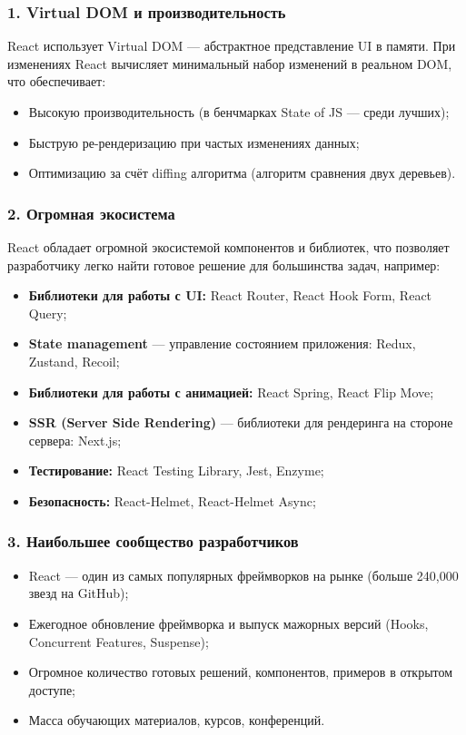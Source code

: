 \subsubsection*{1. Virtual DOM и производительность}
React использует Virtual DOM — абстрактное представление UI в памяти. При изменениях
React вычисляет минимальный набор изменений в реальном DOM, что обеспечивает:

\begin{itemize}
	\item Высокую производительность (в бенчмарках State of JS — среди лучших);
	\item Быструю ре-рендеризацию при частых изменениях данных;
	\item Оптимизацию за счёт diffing алгоритма (алгоритм сравнения двух деревьев).
\end{itemize}

\subsubsection*{2. Огромная экосистема}
React обладает огромной экосистемой компонентов и библиотек, что позволяет разработчику
легко найти готовое решение для большинства задач, например:

\begin{itemize}
	\item \textbf{Библиотеки для работы с UI:} React Router, React Hook Form, React Query;
	\item \textbf{State management} --- управление состоянием приложения: Redux, Zustand, Recoil;
	\item \textbf{Библиотеки для работы с анимацией:} React Spring, React Flip Move;
	\item \textbf{SSR (Server Side Rendering)} --- библиотеки для рендеринга на стороне сервера: Next.js;
	\item \textbf{Тестирование:} React Testing Library, Jest, Enzyme;
	\item \textbf{Безопасность:} React-Helmet, React-Helmet Async;
\end{itemize}

\subsubsection*{3. Наибольшее сообщество разработчиков}

\begin{itemize}
	\item React --- один из самых популярных фреймворков на рынке (больше 240,000 звезд на GitHub);
	\item Ежегодное обновление фреймворка и выпуск мажорных версий (Hooks, Concurrent Features, Suspense);
	\item Огромное количество готовых решений, компонентов, примеров в открытом доступе;
	\item Масса обучающих материалов, курсов, конференций.
\end{itemize}

